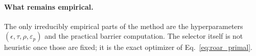 \documentclass{article}
\begin{document}
\paragraph{What remains empirical.}
The only irreducibly empirical parts of the method are the hyperparameters $(\epsilon,\tau,\rho,\varepsilon_p)$ and the practical barrier computation. The selector itself is not heuristic once those are fixed; it is the exact optimizer of Eq.~\eqref{eq:roar_primal}.



\end{document}
